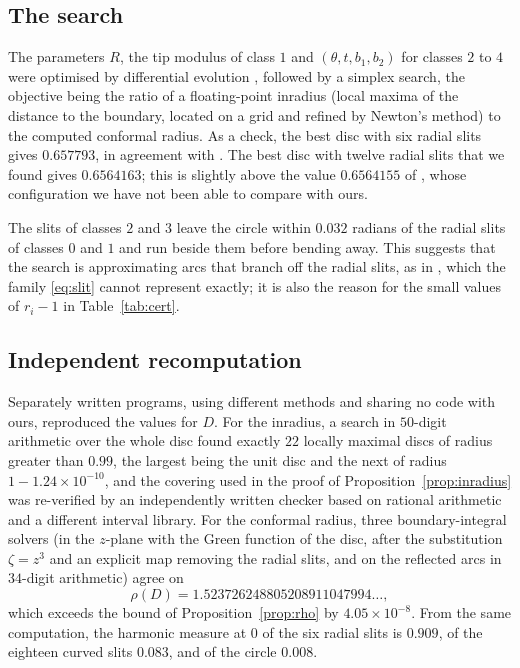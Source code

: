 \documentclass[11pt]{amsart}
\theoremstyle{remark}
\begin{document}
\subsection*{The search}
The parameters $R$, the tip modulus of class $1$ and $(\theta,t,b_1,b_2)$ for classes $2$ to $4$ were optimised
by differential evolution \cite{SP}, followed by a simplex search, the objective being the ratio of a
floating-point inradius (local maxima of the distance to the boundary, located on a grid and refined by Newton's
method) to the computed conformal radius. As a check, the best disc with six radial slits gives $0.657793$, in
agreement with \cite{Rob}. The best disc with twelve radial slits that we found gives $0.6564163$; this is
slightly above the value $0.6564155$ of \cite{BH}, whose configuration we have not been able to compare with ours.

The slits of classes $2$ and $3$ leave the circle within $0.032$ radians of the radial slits of classes $0$ and
$1$ and run beside them before bending away. This suggests that the search is approximating arcs that branch off
the radial slits, as in \cite{OCP}, which the family \eqref{eq:slit} cannot represent exactly; it is also the
reason for the small values of $r_i-1$ in Table~\ref{tab:cert}.

\subsection*{Independent recomputation}
Separately written programs, using different methods and sharing no code with ours, reproduced the values for
$D$. For the inradius, a search in $50$-digit arithmetic over the whole disc found exactly $22$ locally maximal
discs of radius greater than $0.99$, the largest being the unit disc and the next of radius
$1-1.24\times10^{-10}$, and the covering used in the proof of Proposition~\ref{prop:inradius} was re-verified by an
independently written checker based on rational arithmetic and a different interval library. For the conformal
radius, three boundary-integral solvers (in the $z$-plane with the Green function of the disc, after the
substitution $\zeta=z^3$ and an explicit map removing the radial slits, and on the reflected arcs in
$34$-digit arithmetic) agree on
\[
\rho(D)=1.523726248805208911047994\ldots,
\]
which exceeds the bound of Proposition~\ref{prop:rho} by $4.05\times10^{-8}$. From the same computation, the
harmonic measure at $0$ of the six radial slits is $0.909$, of the eighteen curved slits $0.083$, and of the
circle $0.008$.
\end{document}
